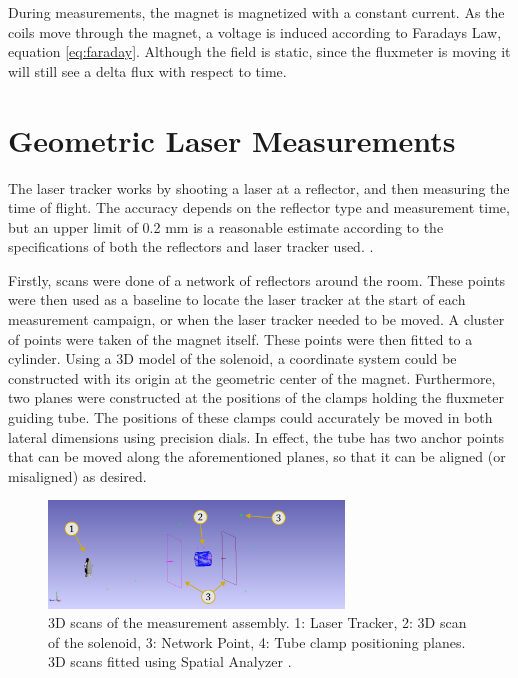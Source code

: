 During measurements, the magnet is magnetized with a constant current.
As the coils move through the magnet, a voltage is induced according
to Faradays Law, equation \ref{eq:faraday}. Although the field is
static, since the fluxmeter is moving it will still see a delta
flux with respect to time.

\section{Geometric Laser Measurements}
The laser tracker works by shooting a laser at a reflector, and then
measuring the time of flight. The accuracy depends on the reflector
type and measurement time, but an upper limit of
0.2 mm is a reasonable estimate according to the
specifications of both the reflectors and laser tracker
used. \cite{leica_manual}.

Firstly, scans were done of a network of reflectors around the
room. These points were then used as a baseline to locate the
laser tracker at the start of each measurement campaign, or when
the laser tracker needed to be moved. A cluster of points were
taken of the magnet itself. These points
were then fitted to a cylinder. Using a 3D model of the
solenoid, a coordinate system could be constructed
with its origin at the geometric center of the magnet.
Furthermore, two planes were constructed at the positions
of the clamps holding the fluxmeter guiding tube. The
positions of these clamps could accurately be moved in
both lateral dimensions using precision dials. In effect,
the tube has two anchor points that can be moved along
the aforementioned planes, so that it can be aligned (or misaligned)
as desired.

\begin{figure}[!h]
    \centering
    \includegraphics[width=0.7\textwidth]{figs/3Dscan}
    \caption{3D scans of the measurement assembly.
        1: Laser Tracker, 2: 3D scan of the solenoid,
        3: Network Point, 4: Tube clamp positioning planes.
        3D scans fitted using Spatial Analyzer \cite{spatial_analyzer}.}
    \label{fig:3dscan}
\end{figure}

